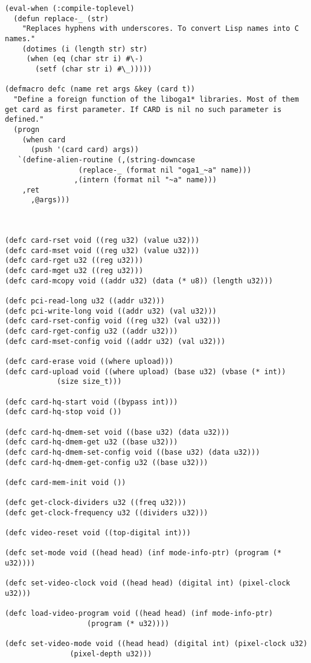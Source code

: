 \documentclass[%
  DIV19]{scrartcl}
\begin{document}
\begin{lstlisting}[label=some-code,caption=SBCL Code to talk to graphics card]
(eval-when (:compile-toplevel)
  (defun replace-_ (str)
    "Replaces hyphens with underscores. To convert Lisp names into C
names."
    (dotimes (i (length str) str)
     (when (eq (char str i) #\-)
       (setf (char str i) #\_)))))

(defmacro defc (name ret args &key (card t))
  "Define a foreign function of the liboga1* libraries. Most of them
get card as first parameter. If CARD is nil no such parameter is
defined."
  (progn
    (when card
      (push '(card card) args))
   `(define-alien-routine (,(string-downcase 
			     (replace-_ (format nil "oga1_~a" name)))
			    ,(intern (format nil "~a" name)))
	,ret
      ,@args)))
 


(defc card-rset void ((reg u32) (value u32)))
(defc card-mset void ((reg u32) (value u32)))
(defc card-rget u32 ((reg u32)))
(defc card-mget u32 ((reg u32)))
(defc card-mcopy void ((addr u32) (data (* u8)) (length u32)))

(defc pci-read-long u32 ((addr u32)))
(defc pci-write-long void ((addr u32) (val u32)))
(defc card-rset-config void ((reg u32) (val u32)))
(defc card-rget-config u32 ((addr u32)))
(defc card-mset-config void ((addr u32) (val u32)))

(defc card-erase void ((where upload)))
(defc card-upload void ((where upload) (base u32) (vbase (* int)) 
			(size size_t)))

(defc card-hq-start void ((bypass int)))
(defc card-hq-stop void ())

(defc card-hq-dmem-set void ((base u32) (data u32)))
(defc card-hq-dmem-get u32 ((base u32)))
(defc card-hq-dmem-set-config void ((base u32) (data u32)))
(defc card-hq-dmem-get-config u32 ((base u32)))

(defc card-mem-init void ())

(defc get-clock-dividers u32 ((freq u32)))
(defc get-clock-frequency u32 ((dividers u32)))

(defc video-reset void ((top-digital int)))

(defc set-mode void ((head head) (inf mode-info-ptr) (program (* u32))))

(defc set-video-clock void ((head head) (digital int) (pixel-clock u32)))

(defc load-video-program void ((head head) (inf mode-info-ptr) 
			       (program (* u32))))

(defc set-video-mode void ((head head) (digital int) (pixel-clock u32)
			   (pixel-depth u32)))


\end{lstlisting}
\end{document}
